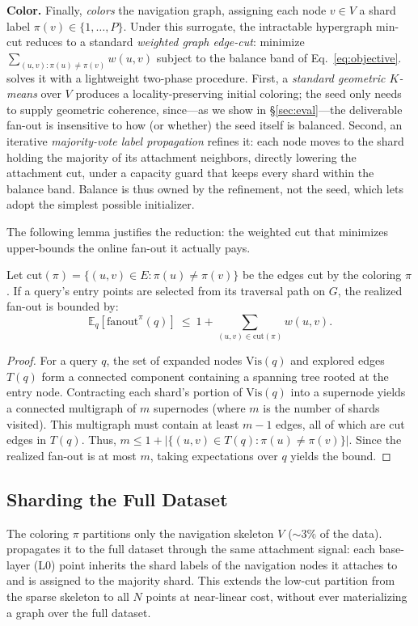 \noindent\textbf{Color.} Finally, \sysname \emph{colors} the navigation graph, assigning each node $v\in V$ a shard label $\pi(v)\in\{1,\dots,P\}$. Under this surrogate, the intractable hypergraph min-cut reduces to a standard \emph{weighted graph edge-cut}: minimize $\sum_{(u,v):\pi(u)\neq\pi(v)} w(u,v)$ subject to the balance band of Eq.~\eqref{eq:objective}. \sysname solves it with a lightweight two-phase procedure. First, a \emph{standard geometric $K$-means} over $V$ produces a locality-preserving initial coloring; the seed only needs to supply geometric coherence, since---as we show in \S\ref{sec:eval}---the deliverable fan-out is insensitive to how (or whether) the seed itself is balanced. Second, an iterative \emph{majority-vote label propagation} refines it: each node moves to the shard holding the majority of its attachment neighbors, directly lowering the attachment cut, under a capacity guard that keeps every shard within the balance band. Balance is thus owned by the refinement, not the seed, which lets \sysname adopt the simplest possible initializer.

The following lemma justifies the reduction: the weighted cut that \sysname minimizes upper-bounds the online fan-out it actually pays.

\begin{lemma}
\label{lem:fanout}
Let $\mathrm{cut}(\pi)=\{(u,v)\in E:\pi(u)\neq\pi(v)\}$ be the edges cut by the coloring $\pi$. If a query's entry points are selected from its traversal path on $G$, the realized fan-out is bounded by:
\[
\mathbb{E}_{q}\!\left[\mathrm{fanout}^\pi(q)\right]
\ \le\ 1+\!\!\sum_{(u,v)\in\mathrm{cut}(\pi)}\!\! w(u,v).
\]
\end{lemma}

\begin{proof}
For a query $q$, the set of expanded nodes $\mathrm{Vis}(q)$ and explored edges $T(q)$ form a connected component containing a spanning tree rooted at the entry node. Contracting each shard's portion of $\mathrm{Vis}(q)$ into a supernode yields a connected multigraph of $m$ supernodes (where $m$ is the number of shards visited). This multigraph must contain at least $m-1$ edges, all of which are cut edges in $T(q)$. Thus, $m \le 1 + |\{(u,v)\in T(q):\pi(u)\neq\pi(v)\}|$. Since the realized fan-out is at most $m$, taking expectations over $q$ yields the bound.
\end{proof}

\subsection{Sharding the Full Dataset}
The coloring $\pi$ partitions only the navigation skeleton $V$ ($\sim\!3\%$ of the data). \sysname propagates it to the full dataset through the same attachment signal: each base-layer (L0) point inherits the shard labels of the navigation nodes it attaches to and is assigned to the majority shard. This extends the low-cut partition from the sparse skeleton to all $N$ points at near-linear cost, without ever materializing a graph over the full dataset.

